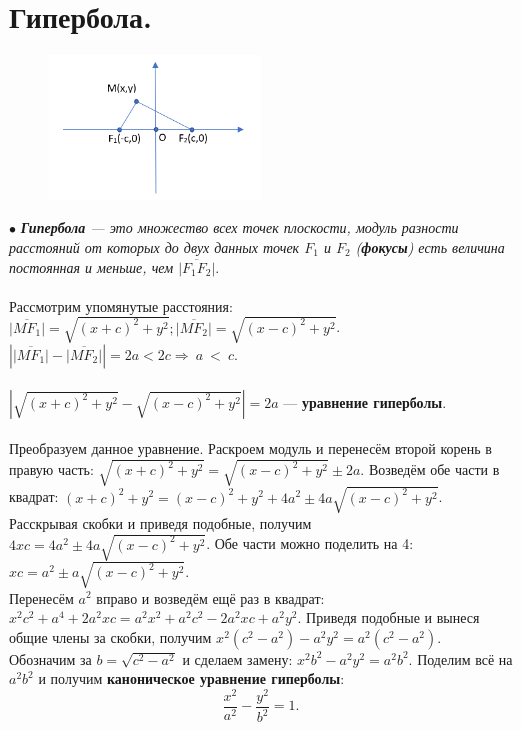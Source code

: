 \documentclass[a4paper, 12pt]{report}
\begin{document}
\section{Гипербола.}

\begin{figure}
	\includegraphics[width=0.5\textwidth]{Гипербола_1.PNG}
	\label{ris:image}
\end{figure}
$\bullet$ \textit{\textbf{Гипербола} --- это множество всех точек плоскости, модуль разности расстояний от которых до двух данных точек $F_1$ и $F_2$ (\textbf{фокусы}) есть величина постоянная и меньше, чем $\overline{|F_1F_2|}$}.\\\\
Рассмотрим упомянутые расстояния: $\overline{|MF_1|} = \sqrt{(x+c)^2 + y^2}; \overline{|MF_2|} = \sqrt{(x-c)^2 + y^2}$. $|\overline{|MF_1|} - \overline{|MF_2|}| = 2a < 2c \Rightarrow ~a ~< ~c$.\\\\
$|\sqrt{(x+c)^2 + y^2} - \sqrt{(x-c)^2 + y^2}| = 2a$ --- \textbf{уравнение гиперболы}.\\\\
Преобразуем данное уравнение. Раскроем модуль и перенесём второй корень в правую часть: $\sqrt{(x+c)^2 + y^2} = \sqrt{(x-c)^2 + y^2} \pm 2a$. Возведём обе части в квадрат: $(x+c)^2 + y^2 = (x-c)^2 + y^2 + 4a^2 \pm 4a\sqrt{(x-c)^2 + y^2}$.\\
Расскрывая скобки и приведя подобные, получим $4xc = 4a^2 \pm 4a\sqrt{(x-c)^2 + y^2}$. Обе части можно поделить на 4: $xc = a^2 \pm a\sqrt{(x-c)^2 + y^2}$.\\
Перенесём $a^2$ вправо и возведём ещё раз в квадрат: $x^2c^2 + a^4 + 2a^2xc = a^2x^2 + a^2c^2 - 2a^2xc + a^2y^2$. Приведя подобные и вынеся общие члены за скобки, получим $x^2(c^2 - a^2) - a^2y^2 = a^2(c^2 - a^2)$.\\
Обозначим за $b = \sqrt{c^2 - a^2}$ и сделаем замену: $x^2b^2 - a^2y^2 = a^2b^2$. Поделим всё на $a^2b^2$ и получим \textbf{каноническое уравнение гиперболы}: $$\dfrac{x^2}{a^2} - \dfrac{y^2}{b^2} = 1.$$
\end{document}
